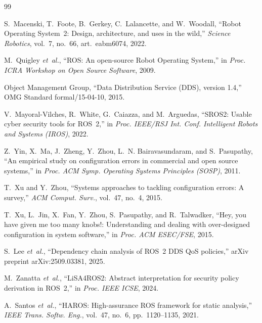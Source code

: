 \documentclass[conference]{IEEEtran}
\begin{document}
\begin{thebibliography}{99}

S.~Macenski, T.~Foote, B.~Gerkey, C.~Lalancette, and W.~Woodall, ``Robot Operating System~2: Design, architecture, and uses in the wild,'' \emph{Science Robotics}, vol.~7, no.~66, art.~eabm6074, 2022.

M.~Quigley \emph{et~al.}, ``{ROS}: An open-source Robot Operating System,'' in \emph{Proc. ICRA Workshop on Open Source Software}, 2009.

Object Management Group, ``Data Distribution Service ({DDS}), version 1.4,'' OMG Standard formal/15-04-10, 2015.

V.~Mayoral-Vilches, R.~White, G.~Caiazza, and M.~Arguedas, ``{SROS2}: Usable cyber security tools for {ROS}~2,'' in \emph{Proc. IEEE/RSJ Int. Conf. Intelligent Robots and Systems (IROS)}, 2022.

Z.~Yin, X.~Ma, J.~Zheng, Y.~Zhou, L.~N. Bairavasundaram, and S.~Pasupathy, ``An empirical study on configuration errors in commercial and open source systems,'' in \emph{Proc. ACM Symp. Operating Systems Principles (SOSP)}, 2011.

T.~Xu and Y.~Zhou, ``Systems approaches to tackling configuration errors: A survey,'' \emph{ACM Comput. Surv.}, vol.~47, no.~4, 2015.

T.~Xu, L.~Jin, X.~Fan, Y.~Zhou, S.~Pasupathy, and R.~Talwadker, ``Hey, you have given me too many knobs!: Understanding and dealing with over-designed configuration in system software,'' in \emph{Proc. ACM ESEC/FSE}, 2015.

S.~Lee \emph{et~al.}, ``Dependency chain analysis of {ROS}~2 {DDS} {QoS} policies,'' arXiv
preprint arXiv:2509.03381, 2025.

M.~Zanatta \emph{et~al.}, ``{LiSA4ROS2}: Abstract interpretation for security policy derivation
in {ROS}~2,'' in \emph{Proc. IEEE ICSE}, 2024.

A.~Santos \emph{et~al.}, ``{HAROS}: High-assurance {ROS} framework for static analysis,''
\emph{IEEE Trans. Softw. Eng.}, vol.~47, no.~6, pp.~1120--1135, 2021.


\end{thebibliography}
\end{document}
